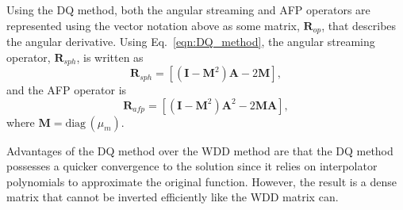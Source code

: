Using the DQ method, both the angular streaming and AFP operators are represented using the vector notation above as some matrix, $\boldsymbol{R}_{op}$, that describes the angular derivative. Using Eq.~\eqref{eqn:DQ_method}, the angular streaming operator, $\boldsymbol{R}_{sph}$, is written as
\begin{equation} \label{eqn:angular_discretization_angular_streaming}
    \boldsymbol{R}_{sph} = \left[ (\boldsymbol{I} - \boldsymbol{M}^2) \boldsymbol{A} - 2 \boldsymbol{M} \right],
\end{equation}
and the AFP operator is
\begin{equation} \label{eqn:angular_discretization_afp}
    \boldsymbol{R}_{afp} = \left[ (\boldsymbol{I} - \boldsymbol{M}^2) \boldsymbol{A}^2 - 2 \boldsymbol{M} \boldsymbol{A} \right],
\end{equation}
where $\boldsymbol{M} = \text{diag} \, (\mu_m)$.

Advantages of the DQ method over the WDD method are that the DQ method possesses a quicker convergence to the solution since it relies on interpolator polynomials to approximate the original function. However, the result is a dense matrix that cannot be inverted efficiently like the WDD matrix can.